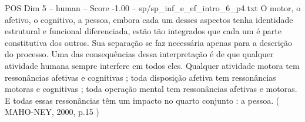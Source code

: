 \begin{textsample}{POS Dim 5 – human – Score -1.00 – sp/sp\_inf\_e\_ef\_intro\_6\_p4.txt}  \label{ex:f5_pos_008}
O motor, o afetivo, o cognitivo, a pessoa, embora cada um desses aspectos tenha identidade estrutural e funcional diferenciada, estão tão integrados que cada um é parte constitutiva dos outros.
Sua separação se faz necessária apenas para a descrição do processo.
Uma das consequências dessa interpretação é de que qualquer atividade humana sempre interfere em todos eles.
Qualquer atividade motora tem ressonâncias afetivas e cognitivas ; toda disposição afetiva tem ressonâncias motoras e cognitivas ; toda operação mental tem ressonâncias afetivas e motoras.
E todas essas ressonâncias têm um impacto no quarto conjunto : a pessoa. ( MAHO-NEY, 2000, p.15 )

\end{textsample}
